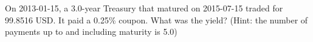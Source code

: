 On 2013-01-15, a 3.0-year Treasury that matured on 2015-07-15 traded for 99.8516 USD. It paid a 0.25\% coupon. What was the yield? (Hint: the number of payments up to and including maturity is 5.0)
